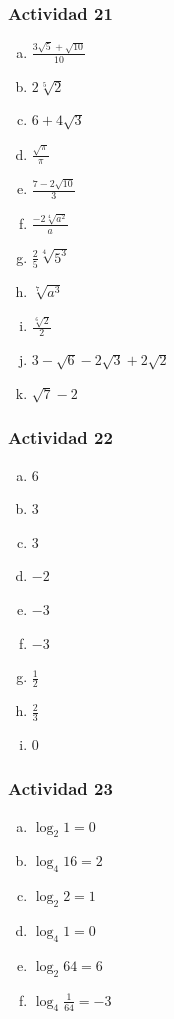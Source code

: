 \documentclass[a4paper, twocolumn]{article}
\begin{document}
\subsubsection*{Actividad 21}
\begin{enumerate}[a)]
\item $\frac{3\sqrt{5}+\sqrt{10}}{10}$
\item $2\sqrt[5]{2}$ %
\item $6+4\sqrt{3}$
\item $\frac{\sqrt{\pi}}{\pi}$
\item $\frac{7-2\sqrt{10}}{3}$
\item $\frac{-2\sqrt[4]{a^2}}{a}$ 
\item $\frac{2}{5}\sqrt[4]{5^3}$
\item $\sqrt[7]{a^3}$
\item $\frac{\sqrt[6]{2}}{2}$
\item $3-\sqrt{6}-2\sqrt{3}+2\sqrt{2}$
\item $\sqrt{7}-2$
\end{enumerate}

\subsubsection*{Actividad 22}
\begin{enumerate}[a)]
\item $6$
\item $3$
\item $3$
\item $-2$
\item $-3$
\item $-3$
\item $\frac{1}{2}$
\item $\frac{2}{3}$
\item $0$
\end{enumerate}

\subsubsection*{Actividad 23}
\begin{enumerate}[a)]
\item $\log_2{1}=0$
\item $\log_4{16}=2$
\item $\log_2{2}=1$
\item $\log_4{1}=0$
\item $\log_2{64}=6$
\item $\log_4{\frac{1}{64}}=-3$
\end{enumerate}
\end{document}

